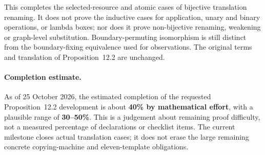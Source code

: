 
This completes the selected-resource and atomic cases of bijective translation
renaming. It does not prove the inductive cases for application, unary and
binary operations, or lambda boxes; nor does it prove non-bijective renaming,
weakening or graph-level substitution. Boundary-permuting isomorphism is
still distinct from the boundary-fixing equivalence used for observations.
The original terms and translation of Proposition~12.2 are unchanged.

\paragraph{Completion estimate.}
As of 25 October 2026, the estimated completion of the requested
Proposition~12.2 development is about \textbf{40\% by mathematical effort},
with a plausible range of \textbf{30--50\%}. This is a judgement about remaining
proof difficulty, not a measured percentage of declarations or checklist items.
The current milestone closes actual translation cases; it does not erase the
large remaining concrete copying-machine and eleven-template obligations.

